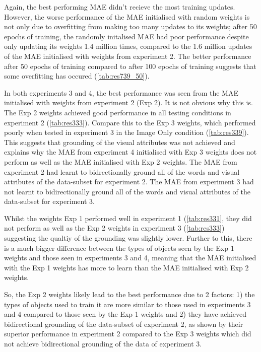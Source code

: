 Again, the best performing \ac{MAE} didn't recieve the most training updates. However, the worse performance of the \ac{MAE} initialised with random weights is not only due to overfitting from making too many updates to its weights; after 50 epochs of training, the randomly initalised MAE had poor performance despite only updating its weights 1.4 million times, compared to the 1.6 million updates of the \ac{MAE} initialised with weights from experiment 2. The better performance after 50 epochs  of training compared to after 100 epochs of training suggests that some overfitting has occured (\autoref{tab:res739_50}).



In both experiments 3 and 4, the best performance was seen from the MAE initialised with weights from experiment 2 (Exp 2). It is not obvious why this is. The Exp 2 weights achieved good performance in all testing conditions in experiment 2 (\autoref{tab:res333}). Compare this to the Exp 3 weights, which performed poorly when tested in experiment 3 in the Image Only condition (\autoref{tab:res339}). This suggests that grounding of the visual attributes was not achieved and explains why the \ac{MAE} from experiment 4 initialised with Exp 3 weights does not perform as well as the \ac{MAE} initialised with Exp 2 weights. The \ac{MAE} from experiment 2 had learnt to bidrectionally ground all of the words and visual attributes of the data-subset for experiment 2. The \ac{MAE} from experiment 3 had not learnt to bidirectionally ground all of the words and visual attributes of the data-subset for experiment 3.

Whilst the weights Exp 1 performed well in experiment 1 (\autoref{tab:res331}, they did not perform as well as the Exp 2 weights in experiment 3 (\autoref{tab:res333}) suggesting the qualtiy of the grounding was slightly lower. Further to this, there is a much bigger difference between the types of objects seen by the Exp 1 weights and those seen in experiments 3 and 4, meaning that the \ac{MAE} initialised with the Exp 1 weights has more to learn than the \ac{MAE} initialised with Exp 2 weights.

So, the Exp 2 weights likely lead to the best performance due to 2 factors: 1) the types of objects used to train it are more similar to those used in experiments 3 and 4 compared to those seen by the Exp 1 weights and 2) they have achieved bidirectional grounding of the data-subset of experiment 2, as shown by their superior performance in experiment 2 compared to the Exp 3 weights which did not achieve bidirectional grounding of the data of experiment 3.


